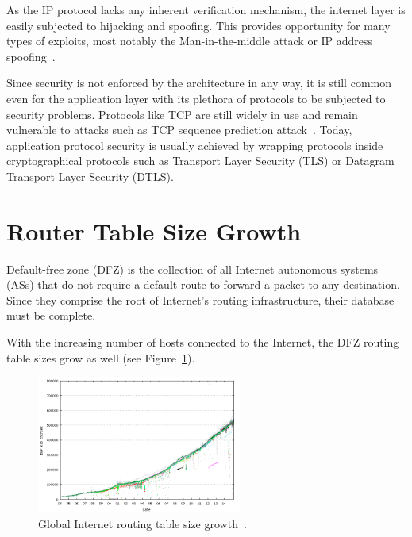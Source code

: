         As the IP protocol lacks any inherent verification mechanism, the internet layer is easily subjected to hijacking and spoofing. This provides opportunity for many types of exploits, most notably the Man-in-the-middle attack or IP address spoofing~\cite{rfc1948}.

        Since security is not enforced by the architecture in any way, it is still common even for the application layer with its plethora of protocols to be subjected to security problems. Protocols like TCP are still widely in use and remain vulnerable to attacks such as TCP sequence prediction attack~\cite{rfc1948}. Today, application protocol security is usually achieved by wrapping protocols inside cryptographical protocols such as Transport Layer Security (TLS) or Datagram Transport Layer Security (DTLS).

    \section{Router Table Size Growth}

        Default-free zone (DFZ) is the collection of all Internet autonomous systems (ASs) that do not require a default route to forward a packet to any destination. Since they comprise the root of Internet's routing infrastructure, their database must be complete.

        With the increasing number of hosts connected to the Internet, the DFZ routing table sizes grow as well (see Figure~\ref{fig:bgp-growth}).

        \begin{figure}[H]
            \begin{center}
                \includegraphics[width=0.6\textwidth]{fig/problems_bgp-growth.png}
              \caption{Global Internet routing table size growth~\cite{bgpgrow}.}
              \label{fig:bgp-growth}
            \end{center}
        \end{figure}

